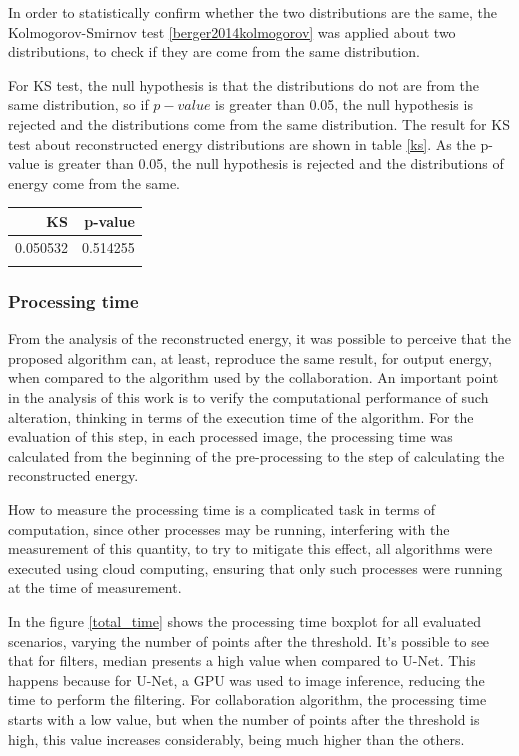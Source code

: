 \documentclass[
        oneside,      %
        english,			
        brazil			 
        ]{abntbibufjf}
\begin{document}
In order to statistically confirm whether the two distributions are the same, the Kolmogorov-Smirnov test \ref{berger2014kolmogorov} was applied about two distributions, to check if they are come from the same distribution. 

For KS test, the null hypothesis is that the distributions do not are from the same distribution, so if $p-value$ is greater than 0.05, the null hypothesis is rejected and the distributions come from the same distribution. The result for KS test about reconstructed energy distributions are shown in table \ref{ks}. As the p-value is greater than 0.05, the null hypothesis is rejected and the distributions of energy come from the same.


\begin{tabular}{rr}
\toprule
       KS &   p-value \\
\midrule
 0.050532 &  0.514255 \\
\bottomrule
\label{ks}
\end{tabular}

\subsubsection{Processing time}

From the analysis of the reconstructed energy, it was possible to perceive that the proposed algorithm can, at least, reproduce the same result, for output energy, when compared to the algorithm used by the collaboration. An important point in the analysis of this work is to verify the computational performance of such alteration, thinking in terms of the execution time of the algorithm. For the evaluation of this step, in each processed image, the processing time was calculated from the beginning of the pre-processing to the step of calculating the reconstructed energy. 

How to measure the processing time is a complicated task in terms of computation, since other processes may be running, interfering with the measurement of this quantity, to try to mitigate this effect, all algorithms were executed using cloud computing, ensuring that only such processes were running at the time of measurement.


In the figure \ref{total_time} shows the processing time boxplot for all evaluated scenarios, varying the number of points after the threshold. It's possible to see that for filters, median presents a high value when compared to U-Net. This happens because for U-Net, a GPU was used to image inference, reducing the time to perform the filtering. For collaboration algorithm, the processing time starts with a low value, but when the number of points after the threshold is high, this value increases considerably, being much higher than the others.
\end{document}
